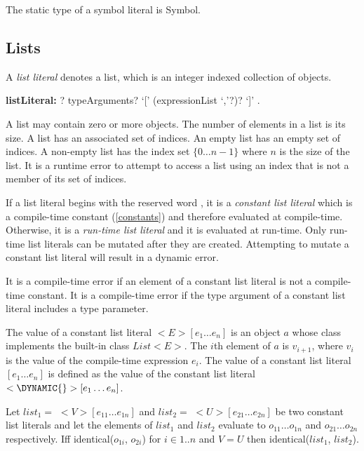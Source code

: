 \documentclass{article}
\newcommand{\code}[1]{{\sf #1}}
\begin{document}
\LMHash{}
The static type of a symbol literal is \code{Symbol}.

\subsection{Lists}

\LMHash{}
A {\em list literal} denotes a list, which is an integer indexed collection of objects.

\begin{grammar}
{\bf listLiteral:}
     \CONST{}? typeArguments? `[' (expressionList `,'?)? `]'
    .
\end{grammar}

\LMHash{}
A list may contain zero or more objects. The number of elements in a list is its size. A list has an associated set of indices.  An empty list has an empty set of indices. A non-empty list has the index set $\{0 \ldots n -1\}$ where $n$ is the size of the list. It is a runtime error to attempt to access a list using an index that is not a member of its set of indices.


\LMHash{}
If a list literal begins with the reserved word \CONST{}, it is a {\em constant list literal} which is a compile-time constant (\ref{constants}) and therefore evaluated at compile-time. Otherwise, it is a {\em run-time list literal} and it is evaluated at run-time. Only run-time list literals can be mutated
after they are created. Attempting to mutate a constant list literal will result in a dynamic error.

\LMHash{}
It is a compile-time error if an element of a constant list literal is not a compile-time constant. It is a compile-time error if the type argument of a constant list literal includes a type parameter.

\LMHash{}
The value of a constant list literal  \CONST{} $<E>[e_1\ldots e_n]$ is an object $a$ whose class implements the built-in class $List<E>$. The $i$th element of $a$ is $v_{i+1}$, where $v_i$ is the value of the compile-time expression $e_i$.  The value of a constant list literal  \CONST{} $[e_1 \ldots e_n]$ is defined as the value of the constant list literal \CONST{}$ < \DYNAMIC{}>[e_1\ldots e_n]$.

\LMHash{}
Let $list_1 =$ \CONST{} $<V>[e_{11} \ldots e_{1n}]$ and $list_2 =$  \CONST{} $<U>[e_{21} \ldots e_{2n}]$ be two constant list literals and let the  elements of $list_1$ and $list_2$  evaluate to  $o_{11} \ldots o_{1n}$ and $o_{21} \ldots o_{2n}$ respectively. Iff \code{identical($o_{1i}$, $o_{2i}$)} for $i \in 1.. n$ and $V = U$ then \code{identical($list_1$, $list_2$)}.
\end{document}
